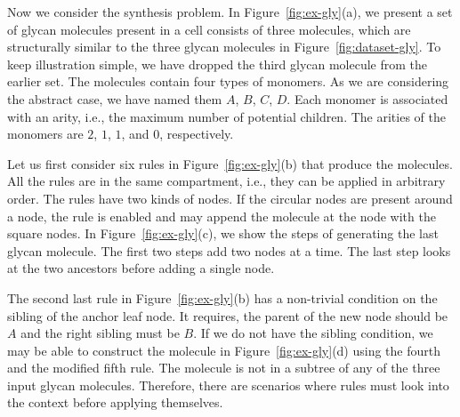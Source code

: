 Now we consider the synthesis problem. In Figure~\ref{fig:ex-gly}(a), we present a set of
glycan molecules present in a cell consists of three molecules, which are structurally similar to the three glycan molecules in Figure~\ref{fig:dataset-gly}.
To keep illustration simple, we have dropped the
third glycan molecule from the earlier set.
The molecules contain four types of monomers.
As we are considering the abstract case, we have named them $A$, $B$, $C$, $D$.
Each monomer is associated with an arity, i.e.,
the maximum number of potential children.
The arities of the monomers are $2$, $1$, $1$, and $0$, respectively.


Let us first consider six rules in Figure~\ref{fig:ex-gly}(b)
that produce the molecules.
All the rules are in the same compartment, i.e., they can be applied in arbitrary order.
The rules have two kinds of nodes.
If the circular nodes are present around a node,
the rule is enabled and may append the molecule at the
node with the square nodes.
In Figure~\ref{fig:ex-gly}(c), we show the steps of generating the last
glycan molecule.
The first two steps add two nodes at a time.
The last step looks at the two ancestors before adding a single node.

The second last rule in Figure~\ref{fig:ex-gly}(b) has a non-trivial condition
on the sibling of the anchor leaf node.
It requires, the parent of the new node should be $A$ and the right sibling
must be $B$.
If we do not have the sibling condition, we may be able to construct the molecule
in Figure~\ref{fig:ex-gly}(d) using the fourth and the modified fifth rule.
The molecule is not in a subtree of any of the three input glycan molecules.
Therefore, there are scenarios where rules must look into the context before applying
themselves.



